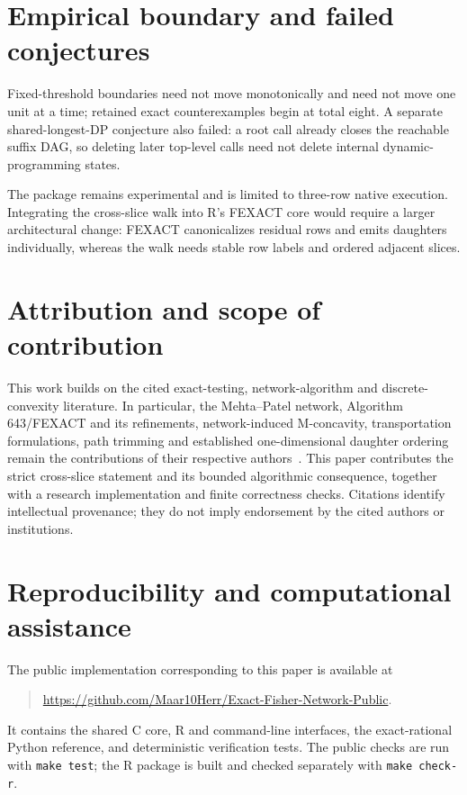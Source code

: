 \documentclass[10pt]{article}
\begin{document}
\section{Empirical boundary and failed conjectures}

Fixed-threshold boundaries need not move monotonically and need not move
one unit at a time; retained exact counterexamples begin at total eight.
A separate shared-longest-DP conjecture also failed: a root call already
closes the reachable suffix DAG, so deleting later top-level calls need
not delete internal dynamic-programming states.

The package remains experimental and is limited to three-row native execution.  Integrating the cross-slice
walk into R's FEXACT core would require a larger architectural change:
FEXACT canonicalizes residual rows and emits daughters individually, whereas
the walk needs stable row labels and ordered adjacent slices.

\section{Attribution and scope of contribution}

This work builds on the cited exact-testing, network-algorithm and
discrete-convexity literature.  In particular, the Mehta--Patel network,
Algorithm 643/FEXACT and its refinements, network-induced M-concavity,
transportation formulations, path trimming and established
one-dimensional daughter ordering remain the contributions of their
respective authors~\cite{mehta1983,mehta1986,clarkson1993,murota1996,
murota2021,aoki2002,suzuki2005,requena2006}.  This paper contributes the
strict cross-slice statement and its bounded algorithmic consequence,
together with a research implementation and finite correctness checks.  Citations identify
intellectual provenance; they do not imply endorsement by the cited
authors or institutions.

\section{Reproducibility and computational assistance}

The public implementation corresponding to this paper is available at
\begin{quote}
\scriptsize
\url{https://github.com/Maar10Herr/Exact-Fisher-Network-Public}.
\end{quote}
It contains the shared C core, R and command-line interfaces, the
exact-rational Python reference, and deterministic verification tests.
The public checks are run with \texttt{make test}; the R package is built
and checked separately with \texttt{make check-r}.
\end{document}
